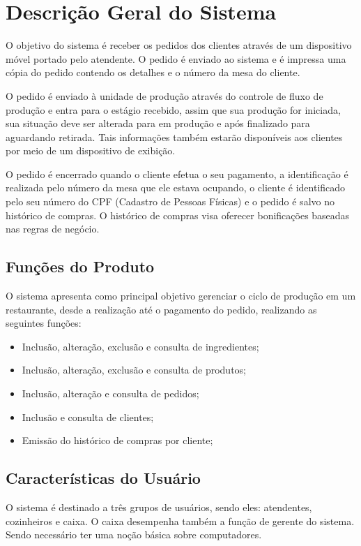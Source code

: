 \documentclass[article, 12pt, oneside, a4paper, brazil]{abntex2}
\begin{document}
 \section{Descrição Geral do Sistema}
 O objetivo do sistema é receber os pedidos dos clientes através de um dispositivo móvel portado pelo atendente. O pedido é enviado ao sistema e é impressa uma cópia do pedido contendo os detalhes e o número da mesa do cliente.
 
 O pedido é enviado à unidade de produção através do controle de fluxo de produção e entra para o estágio recebido, assim que sua produção for iniciada, sua situação deve ser alterada para em produção e após finalizado para aguardando retirada. Tais informações também estarão disponíveis aos clientes por meio de um dispositivo de exibição. 
 
 O pedido é encerrado quando o cliente efetua o seu pagamento, a identificação é realizada pelo número da mesa que ele estava ocupando, o cliente é identificado pelo seu número do CPF (Cadastro de Pessoas Físicas) e o pedido é salvo no histórico de compras. O histórico de compras visa oferecer bonificações baseadas nas regras de negócio.
 
 \subsection{Funções do Produto}
 O sistema apresenta como principal objetivo gerenciar o ciclo de produção em um restaurante, desde a realização até o pagamento do pedido, realizando as seguintes funções:
 
 \begin{itemize}
  \item Inclusão, alteração, exclusão e consulta de ingredientes;
  \item Inclusão, alteração, exclusão e consulta de produtos;
  \item Inclusão, alteração e consulta de pedidos;
  \item Inclusão e consulta de clientes;
  \item Emissão do histórico de compras por cliente;
 \end{itemize}

 \subsection{Características do Usuário}
 O sistema é destinado a três grupos de usuários, sendo eles: atendentes, cozinheiros e caixa. O caixa desempenha também a função de gerente do sistema. Sendo necessário ter uma noção básica sobre computadores.
 
\end{document}
